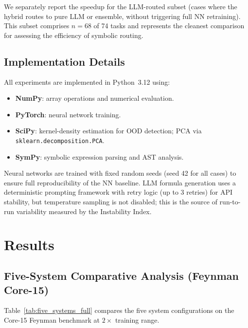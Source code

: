 \documentclass[twoside,11pt]{article}
\begin{document}
We separately report the speedup for the LLM-routed subset (cases where the
hybrid routes to pure LLM or ensemble, without triggering full NN retraining).
This subset comprises $n=68$ of 74 tasks and represents the cleanest comparison
for assessing the efficiency of symbolic routing.

\subsection{Implementation Details}

All experiments are implemented in Python~3.12 using:
\begin{itemize}
  \item \textbf{NumPy}: array operations and numerical evaluation.
  \item \textbf{PyTorch}: neural network training.
  \item \textbf{SciPy}: kernel-density estimation for OOD detection; PCA via
    \texttt{sklearn.decomposition.PCA}.
  \item \textbf{SymPy}: symbolic expression parsing and AST analysis.
\end{itemize}

Neural networks are trained with fixed random seeds (seed 42 for all cases) to
ensure full reproducibility of the NN baseline.  LLM formula generation uses a
deterministic prompting framework with retry logic (up to 3 retries) for API
stability, but temperature sampling is not disabled; this is the source of
run-to-run variability measured by the Instability Index.

\section{Results}
\label{sec:results}

\subsection{Five-System Comparative Analysis (Feynman Core-15)}
\label{sec:five_systems}

Table~\ref{tab:five_systems_full} compares the five system configurations on the
Core-15 Feynman benchmark at $2\times$ training range.
\end{document}
